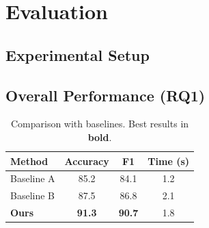\section{Evaluation}
\label{sec:evaluation}


\subsection{Experimental Setup}
\label{subsec:setup}


\subsection{Overall Performance (RQ1)}
\label{subsec:results}

\begin{table}[htbp]
    \caption{Comparison with baselines. Best results in \textbf{bold}.}
    \label{tab:main-results}
    \centering
    \begin{tabular}{lccc}
        \toprule
        Method & Accuracy & F1 & Time (s) \\
        \midrule
        Baseline A \cite{example2023} & 85.2 & 84.1 & 1.2 \\
        Baseline B \cite{conference2022} & 87.5 & 86.8 & 2.1 \\
        \textbf{Ours} & \textbf{91.3} & \textbf{90.7} & 1.8 \\
        \bottomrule
    \end{tabular}
\end{table}


